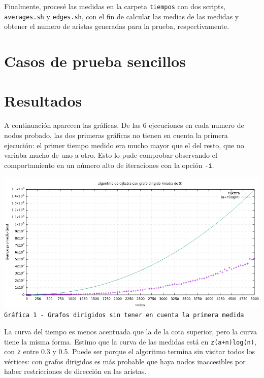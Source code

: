 \documentclass[12pt , a4paper]{article}
\begin{document}
	Finalmente, procesé las medidas en la carpeta \texttt{tiempos} con dos scripts, \texttt{averages.sh} y \texttt{edges.sh}, con el fin de calcular las medias de las medidas y obtener el numero de aristas generadas para la prueba, respectivamente.

\section{Casos de prueba sencillos}

\section{Resultados}

	A continuación aparecen las gráficas. De las 6 ejecuciones en cada numero de nodos probado, las dos primeras gráficas no tienen en cuenta la primera ejecución: el primer tiempo medido era mucho mayor que el del resto, que no variaba mucho de uno a otro. Esto lo pude comprobar observando el comportamiento en un número alto de iteraciones con la opción \texttt{-i}.
	
	\hspace*{-.15\linewidth}
	\includegraphics[width=1.25\hsize]{dir5.png}
	\texttt{Gráfica 1 - Grafos dirigidos sin tener en cuenta la primera medida}
	\newline
	
	La curva del tiempo es menos acentuada que la de la cota superior, pero la curva tiene la misma forma. Estimo que la curva de las medidas está en \texttt{z(a+n)log(n)}, con \texttt{z} entre 0.3 y 0.5. Puede ser porque el algoritmo termina sin visitar todos los vértices: con grafos dirigidos es más probable que haya nodos inaccesibles por haber restricciones de dirección en las aristas. 
	
\end{document}
